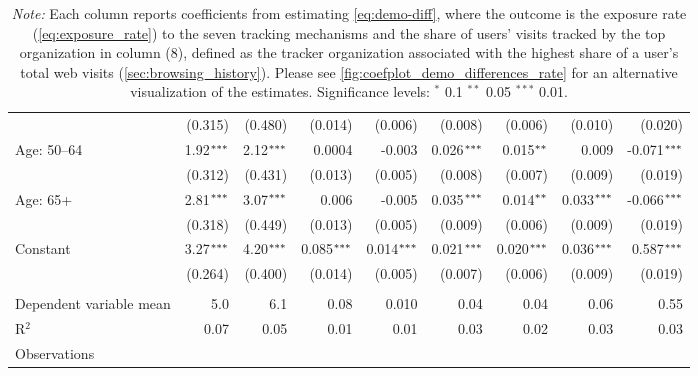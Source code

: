 \begin{table}[!ht]
\begin{adjustbox}{max width=\textwidth}
\begin{tabular}{@{\hspace{0\tabcolsep}}l*{8}{D{.}{.}{-1}}@{\hspace{0\tabcolsep}}}
                              & (0.315)       & (0.480)       & (0.014)       & (0.006)       & (0.008)                & (0.006)                & (0.010)       & (0.020)\\   
      Age: 50--64             & 1.92$\sym{***}$  & 2.12$\sym{***}$  & 0.0004        & -0.003        & 0.026$\sym{***}$          & 0.015$\sym{**}$           & 0.009         & -0.071$\sym{***}$\\   
                              & (0.312)       & (0.431)       & (0.013)       & (0.005)       & (0.008)                & (0.007)                & (0.009)       & (0.019)\\   
      Age: 65+                & 2.81$\sym{***}$  & 3.07$\sym{***}$  & 0.006         & -0.005        & 0.035$\sym{***}$          & 0.014$\sym{**}$           & 0.033$\sym{***}$ & -0.066$\sym{***}$\\   
                              & (0.318)       & (0.449)       & (0.013)       & (0.005)       & (0.009)                & (0.006)                & (0.009)       & (0.019)\\   
      Constant                & 3.27$\sym{***}$  & 4.20$\sym{***}$  & 0.085$\sym{***}$ & 0.014$\sym{***}$ & 0.021$\sym{***}$          & 0.020$\sym{***}$          & 0.036$\sym{***}$ & 0.587$\sym{***}$\\   
                              & (0.264)       & (0.400)       & (0.014)       & (0.005)       & (0.007)                & (0.006)                & (0.009)       & (0.019)\\   
       \\
      Dependent variable mean & 5.0           & 6.1           & 0.08          & 0.010         & 0.04                   & 0.04                   & 0.06          & 0.55\\  
      R$^2$                   & 0.07          & 0.05          & 0.01          & 0.01          & 0.03                   & 0.02                   & 0.03          & 0.03\\  
      Observations &  &  &  &  &  &  &  & \\
      \bottomrule
   \end{tabular}
\end{adjustbox}
\par\endgroup
\caption*{
    \footnotesize \textit{Note:}
    Each column reports coefficients from estimating \cref{eq:demo-diff},
    where the outcome is the exposure rate (\cref{eq:exposure_rate}) to the seven tracking mechanisms and the share of users' visits tracked by the top organization in column (8), defined as the tracker organization associated with the highest share of a user's total web visits (\cref{sec:browsing_history}).
    Please see \cref{fig:coefplot_demo_differences_rate} for an alternative visualization of the estimates.
    Significance levels: $^{*}$ 0.1 $^{**}$ 0.05 $^{***}$ 0.01.
}
\end{table}